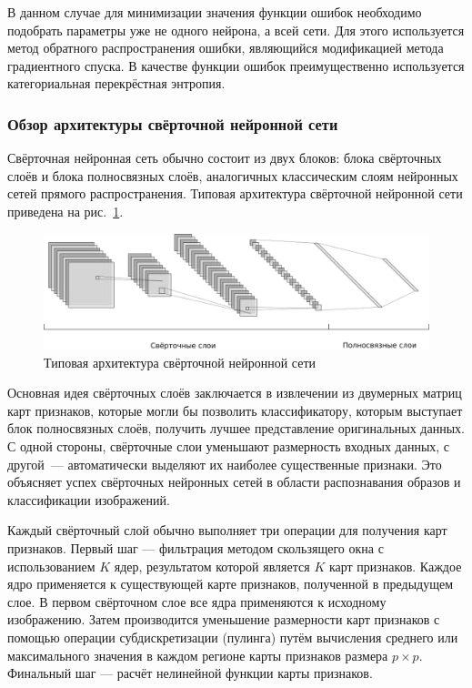 В данном случае для минимизации значения функции ошибок необходимо подобрать параметры уже не одного нейрона, а всей сети. Для этого используется метод обратного распространения ошибки, являющийся модификацией метода градиентного спуска. В качестве функции ошибок преимущественно используется категориальная перекрёстная энтропия.

\subsubsection{Обзор архитектуры свёрточной нейронной сети}

Свёрточная нейронная сеть обычно состоит из двух блоков: блока свёрточных слоёв и блока полносвязных слоёв, аналогичных классическим слоям нейронных сетей прямого распространения. Типовая архитектура свёрточной нейронной сети приведена на рис.~\ref{fig:CNNArchitectureExample}.

\begin{figure}
\centering
\includegraphics[width=1\textwidth]{include/graphics/cnn_architecture_example}
\caption{Типовая архитектура свёрточной нейронной сети}
\label{fig:CNNArchitectureExample}
\end{figure}

Основная идея свёрточных слоёв заключается в извлечении из двумерных матриц карт признаков, которые могли бы позволить классификатору, которым выступает блок полносвязных слоёв, получить лучшее представление оригинальных данных. С одной стороны, свёрточные слои уменьшают размерность входных данных, с другой~--- автоматически выделяют их наиболее существенные признаки. Это объясняет успех свёрточных нейронных сетей в области распознавания образов и классификации изображений.

Каждый свёрточный слой обычно выполняет три операции для получения карт признаков. Первый шаг --- фильтрация методом скользящего окна с использованием $ K $ ядер, результатом которой является $ K $ карт признаков. Каждое ядро применяется к существующей карте признаков, полученной в предыдущем слое. В первом свёрточном слое все ядра применяются к исходному изображению. Затем производится уменьшение размерности карт признаков с помощью операции субдискретизации (пулинга) путём вычисления среднего или максимального значения в каждом регионе карты признаков размера $ p \times p $. Финальный шаг --- расчёт нелинейной функции карты признаков.


